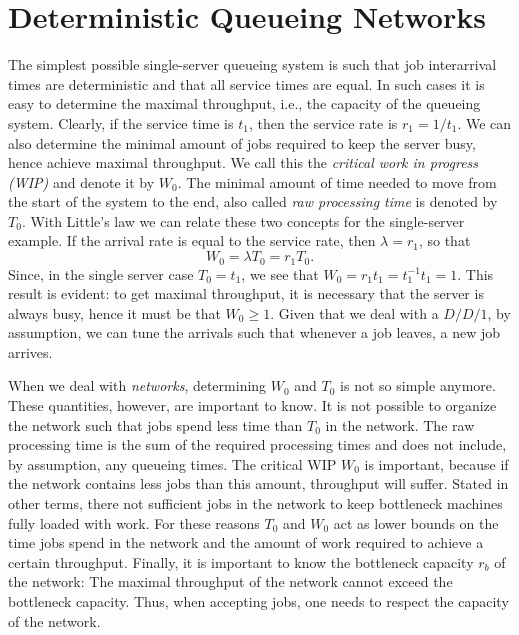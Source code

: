 
\section{Deterministic Queueing Networks}
\label{sec:determ-queu-netw}

The simplest possible single-server queueing system is such that job
interarrival times are deterministic and that all service times are
equal. In such cases it is easy to determine the maximal throughput,
i.e., the capacity of the queueing system. Clearly, if the service
time is $t_1$, then the service rate is $r_1 = 1/t_1$. We can also
determine the minimal amount of jobs required to keep the server busy,
hence achieve maximal throughput.  We call this the \emph{critical
  work in progress (WIP)} and denote it by $W_0$. The minimal amount
of time needed to move from the start of the system to the end, also
called \emph{raw processing time} is denoted by $T_0$.  With Little's
law we can relate these two concepts for the single-server example.
If the arrival rate is equal to the service rate, then
$\lambda = r_1$, so that
\begin{equation*}
  W_0 = \lambda T_0 = r_1 T_0.
\end{equation*}
Since, in the single server case $T_0 = t_1$, we see that
$W_0=r_1 t_1 = t_1^{-1}t_1 = 1$. This result is evident: to get
maximal throughput, it is necessary that the server is always busy,
hence it must be that $W_0\geq 1$. Given that we deal with a $D/D/1$,
by assumption, we can tune the arrivals such that whenever a job
leaves, a new job arrives.

When we deal with \emph{networks}, determining $W_0$ and $T_0$ is not
so simple anymore. These quantities, however, are important to
know. It is not possible to organize the network such that jobs spend
less time than $T_0$ in the network. The raw processing time is the
sum of the required processing times and does not include, by
assumption, any queueing times. The critical WIP $W_0$ is important,
because if the network contains less jobs than this amount, throughput
will suffer. Stated in other terms, there not sufficient jobs in the
network to keep bottleneck machines fully loaded with work. For these
reasons $T_0$ and $W_0$ act as lower bounds on the time jobs spend in
the network and the amount of work required to achieve a certain
throughput.  Finally, it is important to know the bottleneck capacity
$r_b$ of the network: The maximal throughput of the network cannot
exceed the bottleneck capacity. Thus, when accepting jobs, one needs
to respect the capacity of the network. 


